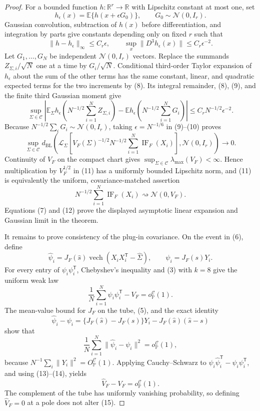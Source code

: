 \documentclass{article}
\begin{document}
\begin{proof}
For a bounded function \(h:\mathbb R^r\to\mathbb R\) with Lipschitz constant at most one, set
\[
 h_{\epsilon}(x)=\mathbb E\{h(x+\epsilon G_0)\},
 \qquad G_0\sim\mathcal N(0,I_r).
\]
Gaussian convolution, subtraction of \(h(x)\) before differentiation, and integration by parts give constants depending only on fixed \(r\) such that
\[
 \lVert h-h_{\epsilon}\rVert_{\infty}\le C_r\epsilon,
 \qquad
 \sup_x\lVert D^3h_{\epsilon}(x)\rVert\le C_r\epsilon^{-2}.
\tag{9}
\]
Let \(G_1,\ldots,G_N\) be independent \(\mathcal N(0,I_r)\) vectors.  Replace the summands \(Z_{\Sigma,i}/\sqrt N\) one at a time by \(G_i/\sqrt N\).  Conditional third-order Taylor expansion of \(h_{\epsilon}\) about the sum of the other terms has the same constant, linear, and quadratic expected terms for the two increments by (8).  Its integral remainder, (8), (9), and the finite third Gaussian moment give
\[
 \sup_{\Sigma\in\mathcal C}
 \left|
 \mathbb E_{\Sigma}h_{\epsilon}\!\left(N^{-1/2}\sum_{i=1}^N Z_{\Sigma,i}\right)
 -\mathbb Eh_{\epsilon}\!\left(N^{-1/2}\sum_{i=1}^N G_i\right)
 \right|
 \le C_rN^{-1/2}\epsilon^{-2}.
\tag{10}
\]
Because \(N^{-1/2}\sum_iG_i\sim\mathcal N(0,I_r)\), taking \(\epsilon=N^{-1/6}\) in (9)--(10) proves
\[
 \sup_{\Sigma\in\mathcal C}
 d_{\mathrm{BL}}\!\left(
  \mathcal L_{\Sigma}\!\left[V_F(\Sigma)^{-1/2}N^{-1/2}
    \sum_{i=1}^N\operatorname{IF}_F(X_i)\right],
  \mathcal N(0,I_r)
 \right)\longrightarrow0.
\tag{11}
\]
Continuity of \(V_F\) on the compact chart gives
\(\sup_{\Sigma\in\mathcal C}\lambda_{\max}(V_F)<\infty\).  Hence multiplication by \(V_F^{1/2}\) in (11) has a uniformly bounded Lipschitz norm, and (11) is equivalently the uniform, covariance-matched assertion
\[
 N^{-1/2}\sum_{i=1}^N\operatorname{IF}_F(X_i)
 \rightsquigarrow\mathcal N(0,V_F).
\tag{12}
\]
Equations (7) and (12) prove the displayed asymptotic linear expansion and Gaussian limit in the theorem.

It remains to prove consistency of the plug-in covariance.  On the event in (6), define
\[
 \widehat\psi_i
 =J_F(\widehat s)\operatorname{vech}(X_iX_i^{\mathsf T}-\widehat\Sigma),
 \qquad
 \psi_i=J_F(s)Y_i.
\]
For every entry of \(\psi_i\psi_i^{\mathsf T}\), Chebyshev's inequality and (3) with \(k=8\) give the uniform weak law
\[
 \frac1N\sum_{i=1}^N\psi_i\psi_i^{\mathsf T}-V_F
 =o_{\mathbb P}^{\mathcal C}(1).
\tag{13}
\]
The mean-value bound for \(J_F\) on the tube, (5), and the exact identity
\[
 \widehat\psi_i-\psi_i
 =\{J_F(\widehat s)-J_F(s)\}Y_i
  -J_F(\widehat s)(\widehat s-s)
\]
show that
\[
 \frac1N\sum_{i=1}^N\lVert\widehat\psi_i-\psi_i\rVert^2
 =o_{\mathbb P}^{\mathcal C}(1),
\tag{14}
\]
because \(N^{-1}\sum_i\lVert Y_i\rVert^2=O_{\mathbb P}^{\mathcal C}(1)\).  Applying Cauchy--Schwarz to
\(\widehat\psi_i\widehat\psi_i^{\mathsf T}-\psi_i\psi_i^{\mathsf T}\), and using (13)--(14), yields
\[
 \widehat V_F-V_F=o_{\mathbb P}^{\mathcal C}(1).
\tag{15}
\]
The complement of the tube has uniformly vanishing probability, so defining \(\widehat V_F=0\) at a pole does not alter (15).


\end{proof}
\end{document}
